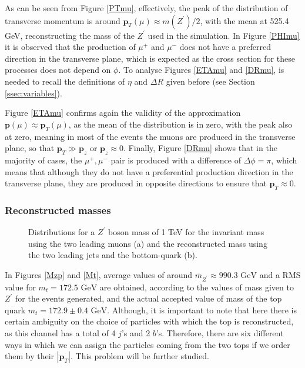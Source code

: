 As can be seen from Figure \ref{PTmu}, effectively, the peak of the distribution of transverse momentum is around $\bm{p}_{T}(\mu) \approx m(Z^{\prime})/2$, with the mean at 525.4 GeV, reconstructing the mass of the $Z^{\prime}$ used in the simulation. In Figure \ref{PHImu} it is observed that the production of $\mu^+$ and $\mu^-$ does not have a preferred direction in the transverse plane, which is expected as the cross section for these processes does not depend on $\phi$. To analyse Figures \ref{ETAmu} and \ref{DRmu}, is needed to recall the definitions of $\eta$ and $\Delta R$ given before (see Section \ref{ssec:variables}).

Figure \ref{ETAmu} confirms again the validity of the approximation $\bm{p}(\mu) \approx \bm{p}_{T}(\mu)$, as the mean of the distribution is in zero, with the peak also at zero, meaning in most of the events the muons are produced in the transverse plane, so that $\bm{p}_T \gg \bm{p}_z$ or $\bm{p}_z \approx 0$. Finally, Figure \ref{DRmu} shows that in the majority of cases, the $\mu^+, \mu^-$ pair is produced with a difference of $\Delta\phi=\pi$, which means that although they do not have a preferential production direction in the transverse plane, they are produced in opposite directions to ensure that $\bm{p}_T \approx 0$.

\subsubsection{Reconstructed masses}

\begin{figure}[ht!]
     \begin{center}
    \end{center}
    \vspace{-1\baselineskip}
    \caption{Distributions for a $Z^{\prime}$ boson mass of 1 TeV for the invariant mass using the two leading muons (a) and the reconstructed mass using the two leading jets and the bottom-quark (b).} 
   \label{preliminarymasses}
\end{figure}

In Figures \ref{Mzp} and \ref{Mt}, average values of around $\overline m_{Z^{\prime}} \approx 990.3 \textrm{ GeV}$ and a RMS value for $ m_t = 172.5 \textrm{ GeV}$ are obtained, according to the values of mass given to $Z^{\prime}$ for the events generated, and the actual accepted value of mass of the top quark $m_t = 172.9 \pm 0.4 \textrm{ GeV}$. Although, it is important to note that here there is certain ambiguity on the choice of particles with which the top is reconstructed, as this channel has a total of 4 $j$'s and 2 $b$'s. Therefore, there are six different ways in which we can assign the particles coming from the two tops if we order them by their $|\bm{p}_T|$. This problem will be further studied.

